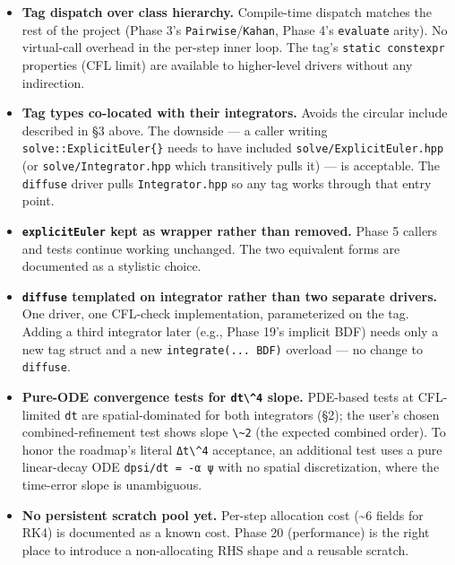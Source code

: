 \begin{itemize}
\tightlist
\item
  \textbf{Tag dispatch over class hierarchy.} Compile-time dispatch
  matches the rest of the project (Phase 3's
  \passthrough{\lstinline!Pairwise!}/\passthrough{\lstinline!Kahan!},
  Phase 4's \passthrough{\lstinline!evaluate!} arity). No virtual-call
  overhead in the per-step inner loop. The tag's
  \passthrough{\lstinline!static constexpr!} properties (CFL limit) are
  available to higher-level drivers without any indirection.
\item
  \textbf{Tag types co-located with their integrators.} Avoids the
  circular include described in §3 above. The downside --- a caller
  writing \passthrough{\lstinline!solve::ExplicitEuler\{\}!} needs to
  have included \passthrough{\lstinline!solve/ExplicitEuler.hpp!} (or
  \passthrough{\lstinline!solve/Integrator.hpp!} which transitively
  pulls it) --- is acceptable. The \passthrough{\lstinline!diffuse!}
  driver pulls \passthrough{\lstinline!Integrator.hpp!} so any tag works
  through that entry point.
\item
  \textbf{\passthrough{\lstinline!explicitEuler!} kept as wrapper rather
  than removed.} Phase 5 callers and tests continue working unchanged.
  The two equivalent forms are documented as a stylistic choice.
\item
  \textbf{\passthrough{\lstinline!diffuse!} templated on integrator
  rather than two separate drivers.} One driver, one CFL-check
  implementation, parameterized on the tag. Adding a third integrator
  later (e.g., Phase 19's implicit BDF) needs only a new tag struct and
  a new \passthrough{\lstinline!integrate(... BDF)!} overload --- no
  change to \passthrough{\lstinline!diffuse!}.
\item
  \textbf{Pure-ODE convergence tests for \passthrough{\lstinline!dt\^4!}
  slope.} PDE-based tests at CFL-limited \passthrough{\lstinline!dt!}
  are spatial-dominated for both integrators (§2); the user's chosen
  combined-refinement test shows slope \passthrough{\lstinline!\~2!}
  (the expected combined order). To honor the roadmap's literal
  \passthrough{\lstinline!Δt\^4!} acceptance, an additional test uses a
  pure linear-decay ODE \passthrough{\lstinline!dpsi/dt = -α ψ!} with no
  spatial discretization, where the time-error slope is unambiguous.
\item
  \textbf{No persistent scratch pool yet.} Per-step allocation cost
  (\textasciitilde6 fields for RK4) is documented as a known cost. Phase
  20 (performance) is the right place to introduce a non-allocating RHS
  shape and a reusable scratch.
\end{itemize}

